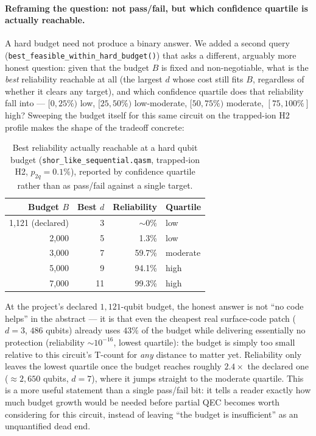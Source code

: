 \documentclass[9pt,twocolumn]{extarticle}
\begin{document}
\paragraph{Reframing the question: not pass/fail, but which confidence quartile is actually reachable.}
A hard budget need not produce a binary answer. We added a second query
(\texttt{best\_feasible\_within\_hard\_budget()}) that asks a different,
arguably more honest question: given that the budget $B$ is fixed and
non-negotiable, what is the \emph{best} reliability reachable at all
(the largest $d$ whose cost still fits $B$, regardless of whether it
clears any target), and which confidence quartile does that reliability
fall into --- $[0,25\%)$ low, $[25,50\%)$ low-moderate, $[50,75\%)$
moderate, $[75,100\%]$ high? Sweeping the budget itself for this same
circuit on the trapped-ion H2 profile makes the shape of the tradeoff concrete:

\begin{table}[t]
\centering\footnotesize
\begin{tabular}{rrrl}
\toprule
Budget $B$ & Best $d$ & Reliability & Quartile \\
\midrule
1{,}121 (declared) & 3 & $\sim$0\% & low \\
2{,}000 & 5 & 1.3\% & low \\
3{,}000 & 7 & 59.7\% & moderate \\
5{,}000 & 9 & 94.1\% & high \\
7{,}000 & 11 & 99.3\% & high \\
\bottomrule
\end{tabular}
\caption{Best reliability actually reachable at a hard qubit budget
(\texttt{shor\_like\_sequential.qasm}, trapped-ion H2, $p_{2q}=0.1\%$), reported by confidence quartile
rather than as pass/fail against a single target.}
\label{tab:budget-quartile}
\end{table}

At the project's declared $1{,}121$-qubit budget, the honest answer is
not ``no code helps'' in the abstract --- it is that even the cheapest
real surface-code patch ($d=3$, $486$ qubits) already uses $43\%$ of the
budget while delivering essentially no protection (reliability
$\sim 10^{-16}$, lowest quartile): the budget is simply too small
relative to this circuit's T-count for \emph{any} distance to matter yet.
Reliability only leaves the lowest quartile once the budget reaches
roughly $2.4\times$ the declared one ($\approx2{,}650$ qubits, $d=7$), where it
jumps straight to the moderate quartile. This is a more useful statement
than a single pass/fail bit: it tells a reader exactly how much budget
growth would be needed before partial QEC becomes worth considering for
this circuit, instead of leaving ``the budget is insufficient'' as an
unquantified dead end.
\end{document}
